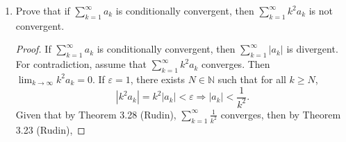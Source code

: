 \documentclass[12pt]{article}
\begin{document}
\begin{enumerate}
\begin{proof}
                Now assume that $\sum_{k=1}^{\infty}\frac{a_k}{1+a_k}$ is
                convergent. Then $\lim_{k\to\infty}\frac{a_k}{1+a_k}=0$.
                Letting $0<\varepsilon<1$, then there exists $N\in\mathbb{N}$ such
                that for all $k\geq N$
                \begin{align*}
                    \frac{a_k}{1+a_k}<\varepsilon
                    &\Leftrightarrow a_k<\varepsilon(1+a_k) \\
                    &\Leftrightarrow a_k(1-\varepsilon)<\varepsilon \\
                    &\Leftrightarrow a_k<\frac{\varepsilon}{1-\varepsilon}.
                \end{align*}
                As $\varepsilon\to 0$, then
                $\frac{\varepsilon}{1-\varepsilon}\to0$ and therefore $a_k\to
                0$ as $k\to\infty$. Since $\lim_{k\to\infty}a_k=0$, then for
                any $1<B$, there exists $N$ such that for all $k\geq N$,
                we have that $1+a_k<B$. Then $\frac{B}{1+a_k}>1$ for all $k\geq
                N$. Thus for all $k\geq N$
                \begin{equation*}
                    a_k\leq\frac{Ba_k}{1+a_k}.
                \end{equation*}
                By Theorem 3.23 (Rudin), 
                \begin{equation*}
                    \sum_{k=1}^{\infty}a_k<\infty.
                \end{equation*}
            \end{proof}
        \item Prove that if $\sum_{k=1}^{\infty}a_k$ is conditionally
            convergent, then $\sum_{k=1}^{\infty}k^2a_k$ is not convergent. 
            \begin{proof}
                If $\sum_{k=1}^{\infty}a_k$ is conditionally convergent, then
                $\sum_{k=1}^{\infty}|a_k|$ is divergent. For contradiction,
                assume that $\sum_{k=1}^{\infty}k^2a_k$ converges. Then
                $\lim_{k\to\infty}k^2a_k=0$. If $\varepsilon=1$, there exists
                $N\in\mathbb{N}$ such that for all $k\geq N$,
                \begin{equation*}
                    |k^2a_k|=k^2|a_k|<\varepsilon\Rightarrow
                    |a_k|<\frac{1}{k^2}.
                \end{equation*}
                Given that by Theorem 3.28 (Rudin), $\sum_{k=1}^{\infty}\frac{1}{k^2}$ 
                converges, then by Theorem 3.23 (Rudin),

\end{proof}
\end{enumerate}
\end{document}
